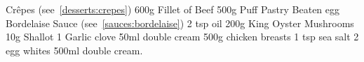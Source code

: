 
\begin{ingreds}
	Cr\^epes (see~\ref{desserts:crepes})
	600g Fillet of Beef
	500g Puff Pastry
	Beaten egg
	Bordelaise Sauce (see~\ref{sauces:bordelaise})
	2 tsp oil
	200g King Oyster Mushrooms
	10g Shallot
	1 Garlic clove
	50ml double cream
	500g chicken breasts
	1 tsp sea salt
	2 egg whites
	500ml double cream.
\end{ingreds}